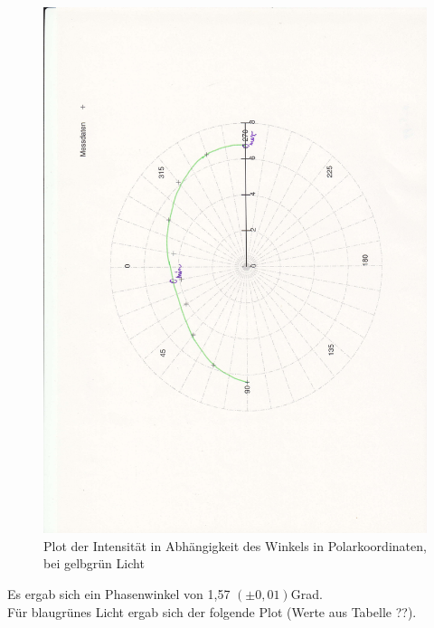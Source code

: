 \documentclass[12pt]{scrartcl}
\begin{document}
\begin{enumerate}
\begin{figure}[H]
\centering
    \includegraphics[scale = 0.3, angle = -90]{a_5_gg.pdf}
  	\caption[Plot der Intensität in Abhängigkeit des Winkels in Polarkoordinaten, bei gelbgrün Licht]{Plot der Intensität in Abhängigkeit des Winkels in Polarkoordinaten, bei gelbgrün Licht}
  \label{fig:a_5_gg}
\end{figure}

Es ergab sich ein Phasenwinkel von 1,57 $(\pm 0,01)$Grad.\\

Für blaugrünes Licht ergab sich der folgende Plot (Werte aus Tabelle ??).


\end{enumerate}
\end{document}
